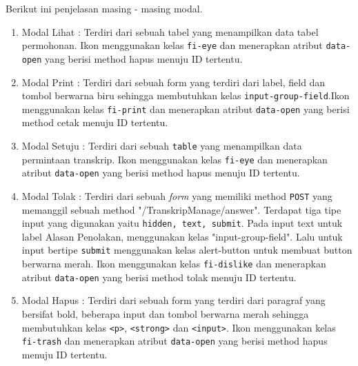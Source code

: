 \documentclass[a4paper,twoside]{article}
\begin{document}
\begin{enumerate}
		Berikut ini penjelasan masing - masing modal.
		\begin{enumerate}
			
			\item Modal Lihat : Terdiri dari sebuah tabel yang menampilkan data tabel permohonan. Ikon menggunakan kelas  \colorbox{mygray}{\texttt{fi-eye}} dan menerapkan atribut  \colorbox{mygray}{\texttt{data-open}} yang berisi method hapus menuju ID tertentu.
			
			\item Modal Print : Terdiri dari sebuah form yang terdiri dari label, field dan tombol berwarna biru sehingga membutuhkan kelas  \colorbox{mygray}{\texttt{input-group-field}}.Ikon menggunakan kelas  \colorbox{mygray}{\texttt{fi-print}} dan menerapkan atribut \texttt{data-open} yang berisi method cetak menuju ID tertentu.
			
			\item Modal Setuju : Terdiri dari sebuah \texttt{table} yang menampilkan data permintaan transkrip. Ikon menggunakan kelas  \colorbox{mygray}{\texttt{fi-eye}} dan menerapkan atribut  \colorbox{mygray}{\texttt{data-open}} yang berisi method hapus menuju ID tertentu.
			
			\item Modal Tolak : Terdiri dari sebuah \textit{form} yang memiliki method \texttt{POST} yang memanggil sebuah method "/TranskripManage/answer". Terdapat tiga tipe input yang digunakan yaitu  \colorbox{mygray}{\texttt{hidden, text, submit}}. Pada input text untuk label Alasan Penolakan, menggunakan kelas "input-group-field". Lalu untuk input bertipe  \colorbox{mygray}{\texttt{submit}} menggunakan kelas alert-button untuk membuat button berwarna merah. Ikon menggunakan kelas \texttt{fi-dislike} dan menerapkan atribut  \colorbox{mygray}{\texttt{data-open}} yang berisi method tolak menuju ID tertentu.	
			
			\item Modal Hapus : Terdiri dari sebuah form yang terdiri dari paragraf yang bersifat bold, beberapa input dan tombol berwarna merah sehingga membutuhkan kelas \colorbox{mygray}{\texttt{<p>}}, \colorbox{mygray}{\texttt{<strong>}} dan \colorbox{mygray}{\texttt{<input>}}. Ikon menggunakan kelas  \colorbox{mygray}{\texttt{fi-trash}} dan menerapkan atribut \colorbox{mygray}{\texttt{data-open}} yang berisi method hapus menuju ID tertentu.
		\end{enumerate}
		

\end{enumerate}
\end{document}
